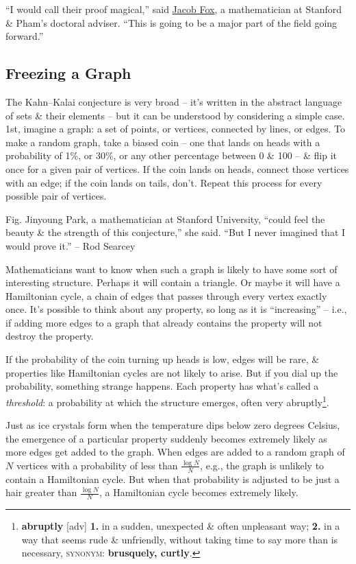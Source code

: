 \documentclass[oneside]{book}
\numberwithin{equation}{section}
\begin{document}
``I would call their proof magical,'' said \href{https://stanford.edu/~jacobfox/}{Jacob Fox}, a mathematician at Stanford \& Pham's doctoral adviser. ``This is going to be a major part of the field going forward.''

\subsection{Freezing a Graph}
The Kahn--Kalai conjecture is very broad -- it's written in the abstract language of sets \& their elements -- but it can be understood by considering a simple case. 1st, imagine a graph: a set of points, or vertices, connected by lines, or edges. To make a random graph, take a biased coin -- one that lands on heads with a probability of 1\%, or 30\%, or any other percentage between 0 \& 100 -- \& flip it once for a given pair of vertices. If the coin lands on heads, connect those vertices with an edge; if the coin lands on tails, don't. Repeat this process for every possible pair of vertices.

\textsf{Fig. Jinyoung Park, a mathematician at Stanford University, ``could feel the beauty \& the strength of this conjecture,'' she said. ``But I never imagined that I would prove it.''} -- Rod Searcey

Mathematicians want to know when such a graph is likely to have some sort of interesting structure. Perhaps it will contain a triangle. Or maybe it will have a Hamiltonian cycle, a chain of edges that passes through every vertex exactly once. It's possible to think about any property, so long as it is ``increasing'' -- i.e., if adding more edges to a graph that already contains the property will not destroy the property.

If the probability of the coin turning up heads is low, edges will be rare, \& properties like Hamiltonian cycles are not likely to arise. But if you dial up the probability, something strange happens. Each property has what's called a \textit{threshold}: a probability at which the structure emerges, often very abruptly\footnote{\textbf{abruptly} [adv] \textbf{1.} in a sudden, unexpected \& often unpleasant way; \textbf{2.} in a way that seems rude \& unfriendly, without taking time to say more than is necessary, \textsc{synonym}: \textbf{brusquely, curtly}.}.

Just as ice crystals form when the temperature dips below zero degrees Celsius, the emergence of a particular property suddenly becomes extremely likely as more edges get added to the graph. When edges are added to a random graph of $N$ vertices with a probability of less than $\frac{\log N}{N}$, e.g., the graph is unlikely to contain a Hamiltonian cycle. But when that probability is adjusted to be just a hair greater than $\frac{\log N}{N}$, a Hamiltonian cycle becomes extremely likely.
\end{document}
